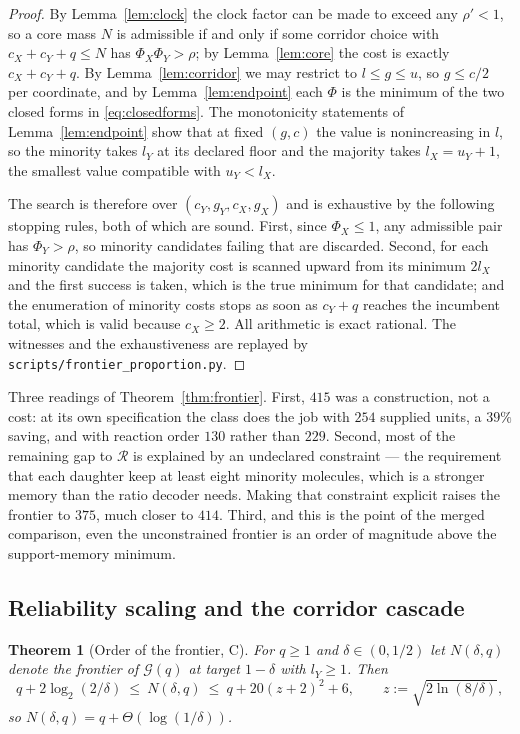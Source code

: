 \documentclass[11pt]{article}
\theoremstyle{plain}
\newtheorem{theorem}{Theorem}[section]
\theoremstyle{definition}
\theoremstyle{remark}
\begin{document}
\begin{proof}
By Lemma~\ref{lem:clock} the clock factor can be made to exceed any
$\rho'<1$, so a core mass $N$ is admissible if and only if some corridor
choice with $c_X+c_Y+q\le N$ has $\Phi_X\Phi_Y>\rho$; by Lemma~\ref{lem:core}
the cost is exactly $c_X+c_Y+q$. By Lemma~\ref{lem:corridor} we may restrict
to $l\le g\le u$, so $g\le c/2$ per coordinate, and by
Lemma~\ref{lem:endpoint} each $\Phi$ is the minimum of the two closed forms in
\eqref{eq:closedforms}. The monotonicity statements of
Lemma~\ref{lem:endpoint} show that at fixed $(g,c)$ the value is nonincreasing
in $l$, so the minority takes $l_Y$ at its declared floor and the majority
takes $l_X=u_Y+1$, the smallest value compatible with $u_Y<l_X$.

The search is therefore over $(c_Y,g_Y,c_X,g_X)$ and is exhaustive by the
following stopping rules, both of which are sound. First, since $\Phi_X\le1$,
any admissible pair has $\Phi_Y>\rho$, so minority candidates failing that are
discarded. Second, for each minority candidate the majority cost is scanned
upward from its minimum $2l_X$ and the first success is taken, which is the
true minimum for that candidate; and the enumeration of minority costs stops
as soon as $c_Y+q$ reaches the incumbent total, which is valid because
$c_X\ge2$. All arithmetic is exact rational. The witnesses and the
exhaustiveness are replayed by \texttt{scripts/frontier\_proportion.py}.
\end{proof}

Three readings of Theorem~\ref{thm:frontier}. First, $415$ was a construction,
not a cost: at its own specification the class does the job with $254$
supplied units, a $39\%$ saving, and with reaction order $130$ rather than
$229$. Second, most of the remaining gap to $\mathcal{R}$ is explained
by an undeclared constraint --- the requirement that each daughter keep at
least eight minority molecules, which is a stronger memory than the ratio
decoder needs. Making that constraint explicit raises the frontier to $375$,
much closer to $414$. Third, and this is the point of the merged comparison,
even the unconstrained frontier is an order of magnitude above the
support-memory minimum.

\subsection{Reliability scaling and the corridor cascade}\label{sec:scaling}

\begin{theorem}[Order of the frontier, C]\label{thm:order}
For $q\ge1$ and $\delta\in(0,1/2)$ let $N(\delta,q)$ denote the frontier of
$\mathcal{G}(q)$ at target $1-\delta$ with $l_Y\ge1$. Then
\begin{equation}\label{eq:order2}
q+2\log_2(2/\delta)\ \le\ N(\delta,q)\ \le\ q+20(z+2)^2+6,
\qquad z:=\sqrt{2\ln(8/\delta)},
\end{equation}
so $N(\delta,q)=q+\Theta(\log(1/\delta))$.
\end{theorem}
\end{document}
